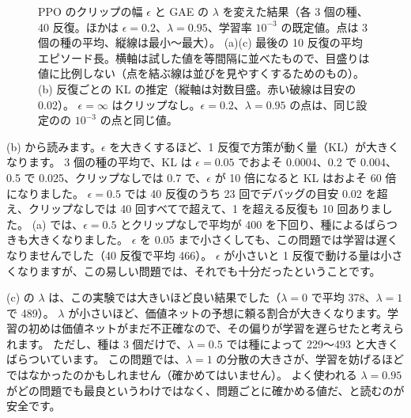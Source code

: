 \begin{figure}[tbp]
\caption{PPO のクリップの幅 $\epsilon$ と GAE の $\lambda$ を変えた結果（各 3 個の種、40 反復。ほかは $\epsilon=0.2$、$\lambda=0.95$、学習率 $10^{-3}$ の既定値。点は 3 個の種の平均、縦線は最小〜最大）。
(a)(c) 最後の 10 反復の平均エピソード長。横軸は試した値を等間隔に並べたもので、目盛りは値に比例しない（点を結ぶ線は並びを見やすくするためのもの）。(b) 反復ごとの KL の推定（縦軸は対数目盛。赤い破線は目安の 0.02）。
$\epsilon=\infty$ はクリップなし。$\epsilon=0.2$、$\lambda=0.95$ の点は、同じ設定のの $10^{-3}$ の点と同じ値。}
\label{fig:pg-eps-lambda}
\end{figure}

(b) から読みます。$\epsilon$ を大きくするほど、1 反復で方策が動く量（KL）が大きくなります。
3 個の種の平均で、KL は $\epsilon=0.05$ でおよそ 0.0004、0.2 で 0.004、0.5 で 0.025、クリップなしでは 0.7 で、$\epsilon$ が 10 倍になると KL はおよそ 60 倍になりました。
$\epsilon=0.5$ では 40 反復のうち 23 回でデバッグの目安 0.02 を超え、クリップなしでは 40 回すべてで超えて、1 を超える反復も 10 回ありました。
(a) では、$\epsilon=0.5$ とクリップなしで平均が 400 を下回り、種によるばらつきも大きくなりました。
$\epsilon$ を 0.05 まで小さくしても、この問題では学習は遅くなりませんでした（40 反復で平均 466）。
$\epsilon$ が小さいと 1 反復で動ける量は小さくなりますが、この易しい問題では、それでも十分だったということです。

(c) の $\lambda$ は、この実験では大きいほど良い結果でした（$\lambda=0$ で平均 378、$\lambda=1$ で 489）。
$\lambda$ が小さいほど、価値ネットの予想に頼る割合が大きくなります。学習の初めは価値ネットがまだ不正確なので、その偏りが学習を遅らせたと考えられます。
ただし、種は 3 個だけで、$\lambda=0.5$ では種によって 229〜493 と大きくばらついています。
この問題では、$\lambda=1$ の分散の大きさが、学習を妨げるほどではなかったのかもしれません（確かめてはいません）。
よく使われる $\lambda=0.95$ がどの問題でも最良というわけではなく、問題ごとに確かめる値だ、と読むのが安全です。

